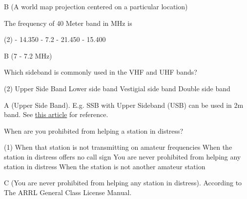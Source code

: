 \documentclass[a4paper]{article}
\begin{document}
\begin{solution}
	B (A world map projection centered on a particular location)
\end{solution}

\vspace{5mm}



\begin{question}The frequency of 40 Meter band in MHz is
	\begin{tasks}(2)
		 - 14.350
		 - 7.2
		 - 21.450
		 - 15.400
	\end{tasks}
\end{question}

\begin{solution}
	B (7 - 7.2 MHz)
\end{solution}

\vspace{5mm}



\begin{question}Which sideband is commonly used in the VHF and UHF bands?
	\begin{tasks}(2)
		\task Upper Side Band
		\task Lower side band
		\task Vestigial side band
		\task Double side band
	\end{tasks}
\end{question}

\begin{solution}
	A (Upper Side Band). E.g. SSB with Upper Sideband (USB) can be used in 2m band. See \href{https://hamradioschool.com/single-sideband-2-meters-vhf-mode/}{this article} for reference.
\end{solution}

\vspace{5mm}



\begin{question}When are you prohibited from helping a station in distress?
	\begin{tasks}(1)
		\task When that station is not transmitting on amateur frequencies
		\task When the station in distress offers no call sign
		\task You are never prohibited from helping any station in distress
		\task When the station is not another amateur station
	\end{tasks}
\end{question}

\begin{solution}
	C (You are never prohibited from helping any station in distress). According to \apostrophe{}The ARRL General Class License Manual\apostrophe{}.
\end{solution}
\end{document}
